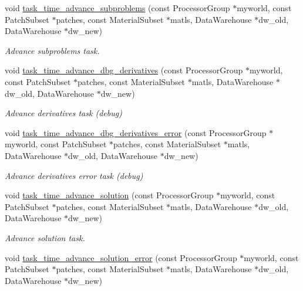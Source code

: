 \begin{DoxyCompactItemize}
void \hyperlink{classUintah_1_1PhaseField_1_1Heat_a3ee8ce1eca59c2eda6b3c8d74f01b175}{task\+\_\+time\+\_\+advance\+\_\+subproblems} (const Processor\+Group $\ast$myworld, const Patch\+Subset $\ast$patches, const Material\+Subset $\ast$matls, Data\+Warehouse $\ast$dw\+\_\+old, Data\+Warehouse $\ast$dw\+\_\+new)
\begin{DoxyCompactList}\small\item\em Advance subproblems task. \end{DoxyCompactList}\item 
void \hyperlink{classUintah_1_1PhaseField_1_1Heat_ac90620287403d8c9c61e40a0da3dde8f}{task\+\_\+time\+\_\+advance\+\_\+dbg\+\_\+derivatives} (const Processor\+Group $\ast$myworld, const Patch\+Subset $\ast$patches, const Material\+Subset $\ast$matls, Data\+Warehouse $\ast$dw\+\_\+old, Data\+Warehouse $\ast$dw\+\_\+new)
\begin{DoxyCompactList}\small\item\em Advance derivatives task (debug) \end{DoxyCompactList}\item 
void \hyperlink{classUintah_1_1PhaseField_1_1Heat_a7ebff904626dc1a31931f649b22f9ec6}{task\+\_\+time\+\_\+advance\+\_\+dbg\+\_\+derivatives\+\_\+error} (const Processor\+Group $\ast$myworld, const Patch\+Subset $\ast$patches, const Material\+Subset $\ast$matls, Data\+Warehouse $\ast$dw\+\_\+old, Data\+Warehouse $\ast$dw\+\_\+new)
\begin{DoxyCompactList}\small\item\em Advance derivatives error task (debug) \end{DoxyCompactList}\item 
void \hyperlink{classUintah_1_1PhaseField_1_1Heat_af8b474103f410ac92f2f4395c9699628}{task\+\_\+time\+\_\+advance\+\_\+solution} (const Processor\+Group $\ast$myworld, const Patch\+Subset $\ast$patches, const Material\+Subset $\ast$matls, Data\+Warehouse $\ast$dw\+\_\+old, Data\+Warehouse $\ast$dw\+\_\+new)
\begin{DoxyCompactList}\small\item\em Advance solution task. \end{DoxyCompactList}\item 
void \hyperlink{classUintah_1_1PhaseField_1_1Heat_a871801188ed73dca7be728514c5711f8}{task\+\_\+time\+\_\+advance\+\_\+solution\+\_\+error} (const Processor\+Group $\ast$myworld, const Patch\+Subset $\ast$patches, const Material\+Subset $\ast$matls, Data\+Warehouse $\ast$dw\+\_\+old, Data\+Warehouse $\ast$dw\+\_\+new)

\end{DoxyCompactItemize}
